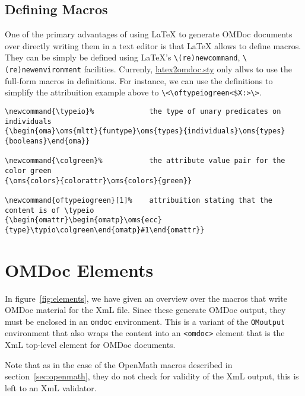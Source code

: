 \documentclass{article}
\def\xml{{\sc XmL}}
\def\openmath{{\sc OpenMath}}
\def\omdocname{{\sc OMDoc}}
\begin{document}
\subsection{Defining Macros}\label{sec:macros}

One of the primary advantages of using {\LaTeX} to generate {\omdocname} documents
over directly writing them in a text editor is that {\LaTeX} allows to define
macros. They can be simply be defined using {\LaTeX}'s {\verb+\(re)newcommand+},
{\verb+\(re)newenvironment+} facilities. Currenly, {\url{latex2omdoc.sty}} only
allws to use the full-form macros in definitions. For instance, we can use the
definitions to simplify the attribuition example above to
{\verb+\<\oftypeiogreen<$X:>\>+}.

{\footnotesize\begin{verbatim}
\newcommand{\typeio}%             the type of unary predicates on individuals
{\begin{oma}\oms{mltt}{funtype}\oms{types}{individuals}\oms{types}{booleans}\end{oma}}

\newcommand{\colgreen}%           the attribute value pair for the color green
{\oms{colors}{colorattr}\oms{colors}{green}}

\newcommand{oftypeiogreen}[1]%    attribuition stating that the content is of \typeio
{\begin{omattr}\begin{omatp}\oms{ecc}{type}\typio\colgreen\end{omatp}#1\end{omattr}}
\end{verbatim}
}

\section{{\omdocname} Elements}\label{sec:omdoc}
In figure~\ref{fig:elements}, we have given an overview over the macros that write
{\omdocname} material for the {\xml} file. Since these generate {\omdocname}
output, they must be enclosed in an {\tt omdoc} environment. This is a variant of
the {\tt OMoutput} environment that also wraps the content into an {\tt <omdoc>}
element that is the {\xml} top-level element for {\omdocname} documents. 

Note that as in the case of the {\openmath} macros described in
section~\ref{sec:openmath}, they do not check for validity of the {\xml} output,
this is left to an {\xml} validator.
\end{document}
